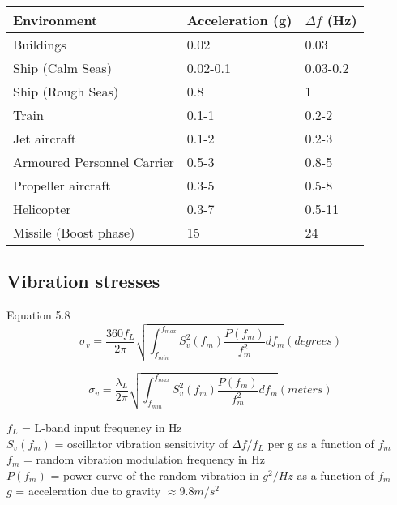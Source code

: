 \begin{table}[!htb]
\centering
\begin{tabular}{|l|l|l|}
\hline
\rowcolor[HTML]{C0C0C0} 
Environment                 & Acceleration (g) & $\Delta f$ (Hz) \\ \hline
Buildings                  & 0.02        &    0.03\\ \hline
\rowcolor[HTML]{EFEFEF} 
Ship (Calm Seas)           & 0.02-0.1    &  0.03-0.2     \\ \hline
Ship (Rough Seas)          & 0.8    &     1          \\ \hline
\rowcolor[HTML]{EFEFEF} 
Train                      & 0.1-1        & 0.2-2              \\ \hline
Jet aircraft               & 0.1-2        & 0.2-3              \\ \hline
\rowcolor[HTML]{EFEFEF} 
Armoured Personnel Carrier & 0.5-3         &  0.8-5             \\ \hline
Propeller aircraft         & 0.3-5         & 0.5-8             \\ \hline
\rowcolor[HTML]{EFEFEF} 
Helicopter                 & 0.3-7         & 0.5-11              \\ \hline
Missile (Boost phase)      & 15          &  24             \\ \hline
\end{tabular}
\caption{\cite{CrystalVibration}}
\label{VibrationLevelsTable}
\end{table}

\subsection{Vibration stresses}
Equation 5.8
\begin{equation}
\sigma_v = \frac{360f_L}{2\pi}\sqrt{\int_{f_{min}}^{f_{max}} S^2_v(f_m) \frac{P(f_m)}{f^2_m} df_m} (degrees)
\end{equation}
\cite{Kaplan}

\begin{equation}
\sigma_v = \frac{\lambda_L}{2\pi}\sqrt{\int_{f_{min}}^{f_{max}} S^2_v(f_m) \frac{P(f_m)}{f^2_m} df_m} (meters)
\end{equation}
\cite{Kaplan}

\begin{framed}
$f_L$ = L-band input frequency in Hz \\
$S_v(f_m)$ = oscillator vibration sensitivity of $\Delta f/f_L$ per g as a function of $f_m$ \\
$f_m$ = random vibration modulation frequency in Hz \\
$P(f_m)$ = power curve of the random vibration in $g^2/Hz$ as a function of $f_m$ \\
$g$ = acceleration due to gravity $\approx 9.8 m/s^2$
\end{framed}


